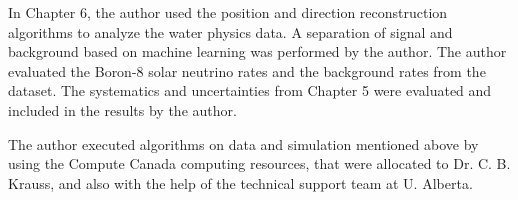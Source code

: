 In Chapter 6, the author used the position and direction reconstruction algorithms to analyze the water physics data. A separation of signal and background based on machine learning was performed by the author. The author evaluated the Boron-8 solar neutrino rates and the background rates from the dataset. The systematics and uncertainties from Chapter 5 were evaluated and included in the results by the author.

The author executed algorithms on data and simulation mentioned above by using the Compute Canada computing resources, that were allocated to Dr. C. B. Krauss, and also with the help of the technical support team at U. Alberta.